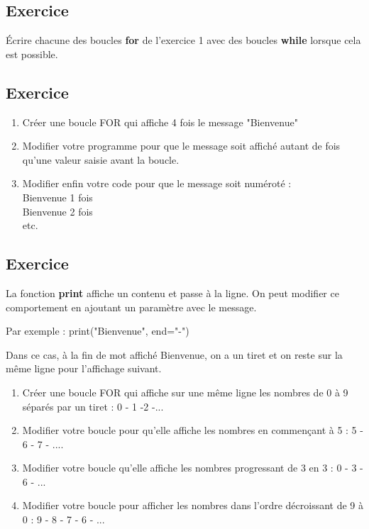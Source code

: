 \documentclass[11pt,a4paper]{article}
\newcounter{numexo}
\begin{document}
\addtocounter{numexo}{1}
\subsection*{\Large Exercice \thenumexo }
Écrire chacune des boucles \textbf{for} de l'exercice 1 avec des boucles \textbf{while} lorsque cela est possible.


\addtocounter{numexo}{1}
\subsection*{\Large Exercice \thenumexo }
\begin{enumerate}
\item Créer une boucle FOR qui affiche 4 fois le message "Bienvenue"
\item Modifier votre programme pour que le message soit affiché autant de fois qu'une valeur saisie avant la boucle.
\item Modifier enfin votre code pour que le message soit numéroté :\\
Bienvenue 1 fois\\
Bienvenue 2 fois\\
etc.
\end{enumerate}

\addtocounter{numexo}{1}
\subsection*{\Large Exercice \thenumexo }
La fonction \textbf{print} affiche un contenu et passe à la ligne. On peut modifier ce comportement en ajoutant un paramètre avec le message.

Par exemple : print("Bienvenue", end="-")

Dans ce cas, à la fin de mot affiché Bienvenue, on a un tiret et on reste sur la même ligne pour l'affichage suivant.

\begin{enumerate}
\item Créer une boucle FOR qui affiche sur une même ligne les nombres de 0 à 9 séparés par un tiret : 0 - 1 -2 -...
\item Modifier votre boucle pour qu'elle affiche les nombres en commençant à 5 : 5 - 6 - 7 - ....
\item Modifier votre boucle qu'elle affiche les nombres progressant de 3 en 3 : 0 - 3 - 6 - ...
\item Modifier votre boucle pour afficher les nombres dans l'ordre décroissant de 9 à 0 : 9 - 8 - 7 - 6 - ...
\end{enumerate}
\end{document}
